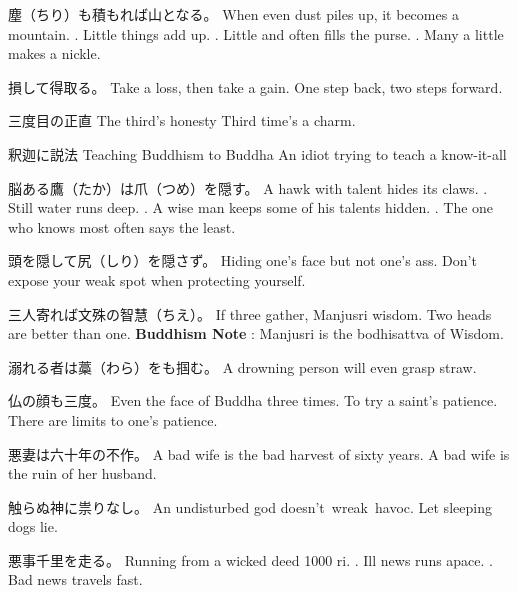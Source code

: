 \par{塵（ちり）も積もれば山となる。 \hfill\break
When even dust piles up, it becomes a mountain. \hfill{}. Little things add up. \hfill{}. Little and often fills the purse. \hfill{}. Many a little makes a nickle. }

\par{損して得取る。 \hfill\break
Take a loss, then take a gain. \hfill\break
One step back, two steps forward. }

\par{三度目の正直 \hfill\break
The third's honesty \hfill\break
Third time's a charm. }

\par{釈迦に説法 \hfill\break
Teaching Buddhism to Buddha \hfill\break
An idiot trying to teach a know-it-all }

\par{脳ある鷹（たか）は爪（つめ）を隠す。 \hfill\break
A hawk with talent hides its claws. \hfill{}. Still water runs deep. \hfill{}. A wise man keeps some of his talents hidden. \hfill{}. The one who knows most often says the least. \hfill\break
}

\par{頭を隠して尻（しり）を隠さず。 \hfill\break
Hiding one's face but not one's ass. \hfill\break
Don't expose your weak spot when protecting yourself. }

\par{三人寄れば文殊の智慧（ちえ）。 \hfill\break
If three gather, Manjusri wisdom. \hfill\break
Two heads are better than one. \hfill\break
\hfill\break
\textbf{Buddhism Note }: Manjusri is the bodhisattva of Wisdom. }

\par{溺れる者は藁（わら）をも掴む。 \hfill\break
A drowning person will even grasp straw. }

\par{仏の顔も三度。 \hfill\break
Even the face of Buddha three times. \hfill\break
To try a saint's patience. \hfill\break
There are limits to one's patience. }

\par{悪妻は六十年の不作。 \hfill\break
A bad wife is the bad harvest of sixty years. \hfill\break
A bad wife is the ruin of her husband. }

\par{触らぬ神に祟りなし。 \hfill\break
An undisturbed god doesn't wreak havoc. \hfill\break
Let sleeping dogs lie. }

\par{悪事千里を走る。 \hfill\break
Running from a wicked deed 1000 ri. \hfill{}. Ill news runs apace. \hfill{}. Bad news travels fast. }

